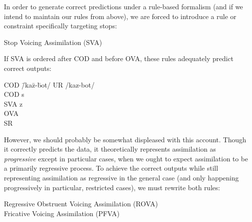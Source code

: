 \documentclass[doc,12pt]{apa6}
\begin{document}
In order to generate correct predictions under a rule-based formalism (and if
we intend to maintain our rules from above), we are forced to introduce a rule
or constraint specifically targeting stops:

\begin{exe}
	\ex Stop Voicing Assimilation (SVA) \\
\end{exe}

\noindent

If SVA is ordered after COD and before OVA, these rules adequately predict
correct outputs:

\begin{exe}
	\ex \begin{tabbing}
		COD \= /ka\=z-\=bot/ \kill
		UR  \> /kaz-bot/ \\
		COD \> \>s \\
		SVA \> \>z \\
		OVA \\
		SR \> [kazbot]
		\end{tabbing}
\end{exe}

\noindent

However, we should probably be somewhat displeased with this account. Though it
correctly predicts the data, it theoretically represents assimilation as
\emph{progressive} except in particular cases, when we ought to expect
assimilation to be a primarily regressive process. To achieve the correct
outputs while still representing assimilation as regressive in the general case
(and only happening progressively in particular, restricted cases), we must
rewrite both rules:

\begin{exe}
	\ex Regressive Obstruent Voicing Assimilation (ROVA) \\
	\ex Fricative Voicing Assimilation (PFVA) \\
\end{exe}
\end{document}

